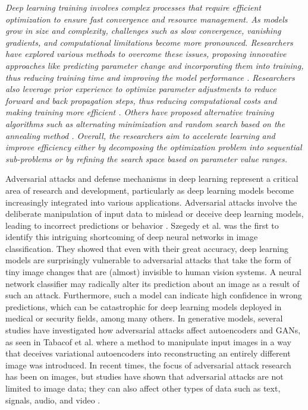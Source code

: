\documentclass[preprint,12pt]{elsarticle}
\begin{document}
\emph{Deep learning training involves complex processes that require efficient optimization to ensure fast convergence and resource management. As models grow in size and complexity, challenges such as slow convergence, vanishing gradients, and computational limitations become more pronounced. Researchers have explored various methods to overcome these issues, proposing innovative approaches like predicting parameter change and incorporating them into training, thus reducing training time and improving the model performance \citep{ying_enhancing_2024}. Researchers also leverage prior experience to optimize parameter adjustments to reduce forward and back propagation steps, thus reducing computational costs and making training more efficient \citep{wang_optimizing_2024}. Others have proposed alternative training algorithms such as alternating minimization \citep{yan_triple-inertial_2025} and random search based on the annealing method \citep{krasnoproshin_random_2024}. Overall, the researchers aim to accelerate learning and improve efficiency either by decomposing the optimization problem into sequential sub-problems or by refining the search space based on parameter value ranges.}

Adversarial attacks and defense mechanisms in deep learning represent a critical area of research and development, particularly as deep learning models become increasingly integrated into various applications. Adversarial attacks involve the deliberate manipulation of input data to mislead or deceive deep learning models, leading to incorrect predictions or behavior \citep{adversarial2018}. Szegedy et al. \citep{szegedy2013intriguing} was the first to identify this intriguing shortcoming of deep neural networks in image classification. They showed that even with their great accuracy, deep learning models are surprisingly vulnerable to adversarial attacks that take the form of tiny image changes that are (almost) invisible to human vision systems. A neural network classifier may radically alter its prediction about an image as a result of such an attack. Furthermore, such a model can indicate high confidence in wrong predictions, which can be catastrophic for deep learning models deployed in medical or security fields, among many others. In generative models, several studies have investigated how adversarial attacks affect autoencoders and GANs, as seen in Tabacof et al. \citep{tabacof2016adversarial} where a method to manipulate input images in a way that deceives variational autoencoders into reconstructing an entirely different image was introduced. In recent times, the focus of adversarial attack research has been on images, but studies have shown that adversarial attacks are not limited to image data; they can also affect other types of data such as text, signals, audio, and video \citep{zhang2020adversarial, jiang2019black, esmaeilpour2019robust}.
\end{document}
